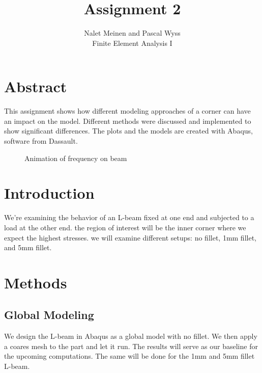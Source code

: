 \documentclass[12pt]{article}
\begin{document}


\title{Assignment 2}%
\author{Nalet Meinen and Pascal Wyss\\ %
Finite Element Analysis I
}
\maketitle
\section*{Abstract}
This assignment shows how different modeling approaches of a corner can have 
an impact on the model. Different methods were discussed and implemented to show 
significant differences. The plots and the models are created with Abaqus, 
software from Dassault.

\begin{figure}[!htb]
  \centering
  \caption{Animation of frequency on beam}
\end{figure}

\tableofcontents
\pagebreak
\section{Introduction}
We're examining the behavior of an L-beam fixed at one end and subjected 
to a load at the other end. the region of interest will be the inner 
corner where we expect the highest stresses. we will examine different 
setups: no fillet, 1mm fillet, and 5mm fillet.


\section{Methods}

\subsection{Global Modeling}

We design the L-beam in Abaqus as a global model with no fillet. We then apply 
a coares mesh to the part and let it run. The results will serve as our baseline 
for the upcoming computations. The same will be done for the 1mm and 5mm 
fillet L-beam.
\end{document}
